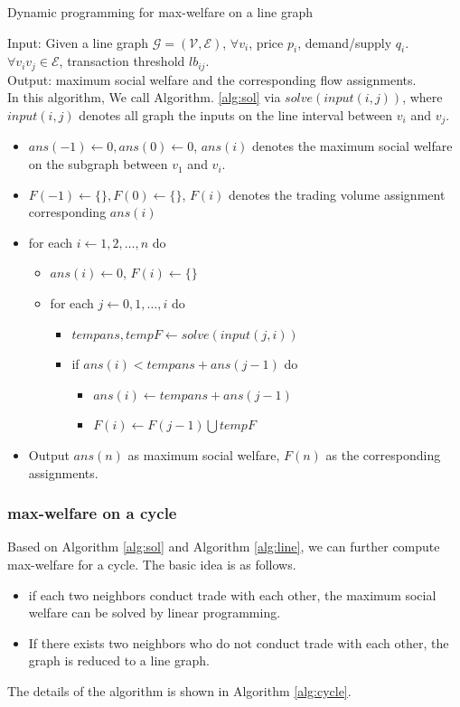 \documentclass{aamas2015}
\begin{document}
\begin{algorithm}\label{alg:line}
	\caption{Dynamic programming for {\sc max-welfare} on a line graph}
	Input:
	Given a line graph $\mathcal{G}=(\mathcal{V},\mathcal{E})$, $\forall v_i$, price $p_i$, demand/supply $q_i$.
	$\forall v_iv_j\in \mathcal{E}$, transaction threshold $lb_{ij}$. \\
	Output: maximum social welfare and the corresponding flow assignments.\\
	In this algorithm, We call Algorithm. \ref{alg:sol} via $solve(input(i,j))$, where $input(i,j)$ denotes all graph the inputs on the line interval between $v_i$ and $v_j$.
	\begin{itemize}
		\item $ans(-1)\leftarrow 0, ans(0)\leftarrow 0$, $ans(i)$ denotes the maximum social welfare on the subgraph between $v_1$ and $v_i$.
		\item $F(-1)\leftarrow \{\}, F(0)\leftarrow \{\}$, $F(i)$ denotes the trading volume assignment corresponding $ans(i)$
		\item for each $i\leftarrow 1,2,\ldots,n$ do
		\begin{itemize}
			\item $ans(i)\leftarrow 0$, $F(i)\leftarrow \{\}$
			\item for each $j\leftarrow 0,1,\ldots,i$ do
			\begin{itemize}
				\item $tempans,tempF\leftarrow solve(input(j,i))$
				\item if $ans(i)<tempans+ans(j-1)$ do
				\begin{itemize}
					\item $ans(i)\leftarrow tempans+ans(j-1)$
					\item $F(i)\leftarrow F(j-1)\bigcup tempF$
				\end{itemize}
			\end{itemize}
		\end{itemize}
		\item Output $ans(n)$ as maximum social welfare, $F(n)$ as the corresponding assignments.
	\end{itemize}
\end{algorithm}

\subsubsection{{\sc max-welfare} on a cycle}

Based on Algorithm \ref{alg:sol} and Algorithm \ref{alg:line}, we can further compute {\sc max-welfare} for a cycle. The basic idea is as follows.
\begin{itemize}
	\item if each two neighbors conduct trade with each other, the maximum social welfare can be solved by linear programming.
	\item If there exists two neighbors who do not conduct trade with each other, the graph is reduced to a line graph.
\end{itemize}
The details of the algorithm is shown in Algorithm \ref{alg:cycle}.
\end{document}
